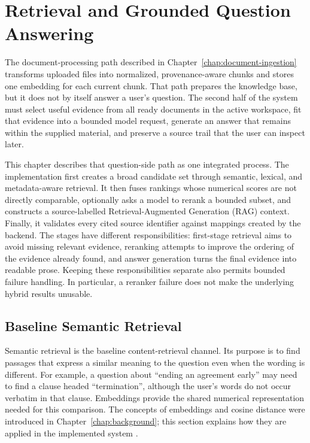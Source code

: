 \chapter{Retrieval and Grounded Question Answering}
\label{chap:retrieval-grounding}

The document-processing path described in Chapter~\ref{chap:document-ingestion} transforms uploaded files into normalized, provenance-aware chunks and stores one embedding for each current chunk. That path prepares the knowledge base, but it does not by itself answer a user's question. The second half of the system must select useful evidence from all ready documents in the active workspace, fit that evidence into a bounded model request, generate an answer that remains within the supplied material, and preserve a source trail that the user can inspect later.

This chapter describes that question-side path as one integrated process. The implementation first creates a broad candidate set through semantic, lexical, and metadata-aware retrieval. It then fuses rankings whose numerical scores are not directly comparable, optionally asks a model to rerank a bounded subset, and constructs a source-labelled Retrieval-Augmented Generation (RAG) context. Finally, it validates every cited source identifier against mappings created by the backend. The stages have different responsibilities: first-stage retrieval aims to avoid missing relevant evidence, reranking attempts to improve the ordering of the evidence already found, and answer generation turns the final evidence into readable prose. Keeping these responsibilities separate also permits bounded failure handling. In particular, a reranker failure does not make the underlying hybrid results unusable.

\section{Baseline Semantic Retrieval}
\label{sec:baseline-semantic-retrieval}

Semantic retrieval is the baseline content-retrieval channel. Its purpose is to find passages that express a similar meaning to the question even when the wording is different. For example, a question about ``ending an agreement early'' may need to find a clause headed ``termination'', although the user's words do not occur verbatim in that clause. Embeddings provide the shared numerical representation needed for this comparison. The concepts of embeddings and cosine distance were introduced in Chapter~\ref{chap:background}; this section explains how they are applied in the implemented system \cite{Karpukhin2020DPR,Manning2008IR}.

